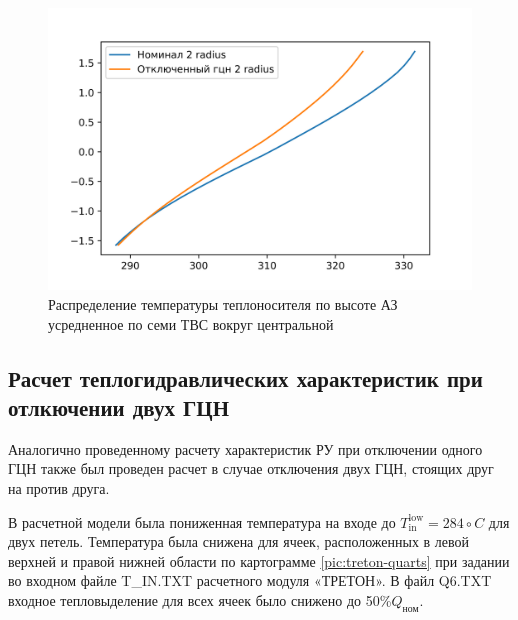 \begin{figure}[H]
	\begin{center}
		\includegraphics{treton_one_gcn_2_radius_T.png}
		\caption{Распределение температуры теплоносителя по высоте АЗ усредненное по семи ТВС вокруг центральной}
		\label{pic:treton-one-gcn-2-radius-T}
	\end{center}
\end{figure}



\subsection{Расчет теплогидравлических характеристик при отлкючении двух ГЦН}
Аналогично проведенному расчету характеристик РУ при отключении одного ГЦН также был проведен расчет в случае отключения двух ГЦН, стоящих друг на против друга.

В расчетной модели была пониженная температура на входе до  $T_{\text{in}}^{\text{low}}=284 \circ C$ для двух петель. Температура была снижена для ячеек, расположенных в левой верхней и правой нижней области по картограмме \ref{pic:treton-quarts} при задании во входном файле T\_IN.TXT расчетного модуля «ТРЕТОН». В файл Q6.TXT входное тепловыделение для всех ячеек было снижено до 50\%$Q_{\text{ном}}$. 

